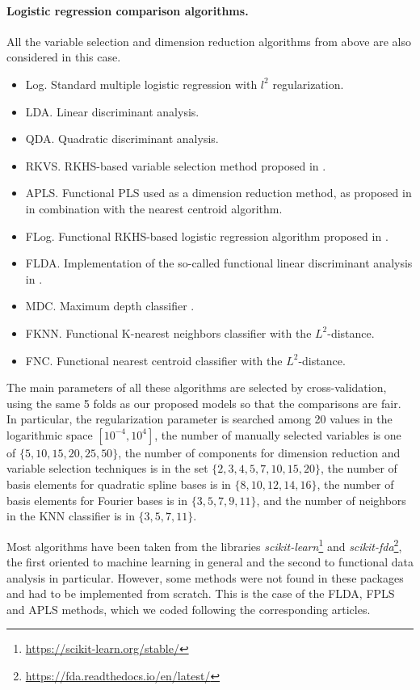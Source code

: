 \paragraph{Logistic regression comparison algorithms.} All the variable selection and dimension reduction algorithms from above are also considered in this case.
\begin{itemize}
  \item Log. Standard multiple logistic regression with \(l^2\) regularization.
  \item LDA. Linear discriminant analysis.
  \item QDA. Quadratic discriminant analysis.
  \item RKVS. RKHS-based variable selection method proposed in \citet{berrendero2018use}.
  \item APLS. Functional PLS used as a dimension reduction method, as proposed in \citet{delaigle2012achieving} in combination with the nearest centroid algorithm.
  \item FLog. Functional RKHS-based logistic regression algorithm proposed in \citet{berrendero2018functional}.
  \item FLDA. Implementation of the so-called functional linear discriminant analysis in \citet{preda2007pls}.
  \item MDC. Maximum depth classifier \citep[e.g.][]{ghosh2005maximum}.
  \item FKNN. Functional K-nearest neighbors classifier with the \(L^2\)-distance.
  \item FNC. Functional nearest centroid classifier with the \(L^2\)-distance.
\end{itemize}

The main parameters of all these algorithms are selected by cross-validation, using the same 5 folds as our proposed models so that the comparisons are fair. In particular, the regularization parameter is searched among 20 values in the logarithmic space \([10^{-4}, 10^4]\), the number of manually selected variables is one of \(\{5, 10, 15, 20, 25, 50\}\), the number of components for dimension reduction and variable selection techniques is in the set \(\{2, 3, 4, 5, 7, 10, 15, 20\}\), the number of basis elements for quadratic spline bases is in \(\{8,10,12,14,16\}\), the number of basis elements for Fourier bases is in \(\{3,5,7,9,11\}\), and the number of neighbors in the KNN classifier is in \(\{3,5,7,11\}\).

Most algorithms have been taken from the libraries \textit{scikit-learn}\footnote{\url{https://scikit-learn.org/stable/}} and \textit{scikit-fda}\footnote{\url{https://fda.readthedocs.io/en/latest/}}, the first oriented to machine learning in general and the second to functional data analysis in particular. However, some methods were not found in these packages and had to be implemented from scratch. This is the case of the FLDA, FPLS and APLS methods, which we coded following the corresponding articles.

